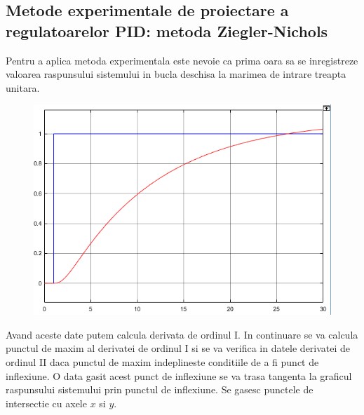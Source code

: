 \documentclass[11pt]{article}
\begin{document}
\subsection{Metode experimentale de proiectare a regulatoarelor PID: metoda Ziegler-Nichols}
Pentru a aplica metoda experimentala este nevoie ca prima oara sa se inregistreze valoarea raspunsului sistemului in bucla deschisa la marimea de intrare treapta unitara.\\
\begin{figure}[H]
	\centering
	\includegraphics[width=.35\linewidth]{zn_desc.png}
	\label{fig:test2}
\end{figure}
Avand aceste date putem calcula derivata de ordinul I. In continuare se va calcula punctul de maxim al derivatei de ordinul I si se va verifica in datele derivatei de ordinul II daca punctul de maxim indeplineste conditiile de a fi punct de inflexiune.
O data gasit acest punct de inflexiune se va trasa tangenta la graficul raspunsului sistemului prin punctul de inflexiune. Se gasesc punctele de intersectie cu axele $x$ si $y$. \\
\end{document}
